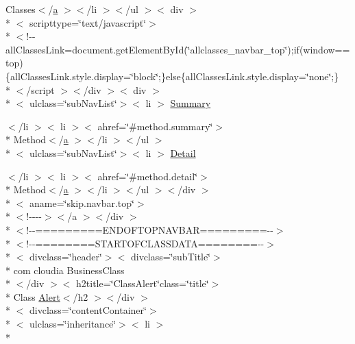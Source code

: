 \begin{DoxyCompactItemize}
\item 
Classes$<$/\hyperlink{style_8css_a5e8981582017bb8b84c21f148345d1f7}{a} $>$$<$/li $>$$<$/ul $>$$<$ div $>$\\*
$<$ scripttype=\char`\"{}text/javascript\char`\"{}$>$\\*
$<$!-\/-\/all\-Classes\-Link=document.\-get\-Element\-By\-Id(\char`\"{}allclasses\-\_\-navbar\-\_\-top\char`\"{});if(window==top)\{all\-Classes\-Link.\-style.\-display=\char`\"{}block\char`\"{};\}else\{all\-Classes\-Link.\-style.\-display=\char`\"{}none\char`\"{};\}\\*
$<$/script $>$$<$/div $>$$<$ div $>$\\*
$<$ ulclass=\char`\"{}sub\-Nav\-List\char`\"{}$>$$<$ li $>$ \hyperlink{_alert_8html_a6f9ab45abc9b0679dc1b132fbacfc681}{Summary}
\item 
$<$/li $>$$<$ li $>$$<$ ahref=\char`\"{}\#method.\-summary\char`\"{}$>$\\*
 Method$<$/\hyperlink{style_8css_a5e8981582017bb8b84c21f148345d1f7}{a} $>$$<$/li $>$$<$/ul $>$\\*
$<$ ulclass=\char`\"{}sub\-Nav\-List\char`\"{}$>$$<$ li $>$ \hyperlink{_alert_8html_aa01aa9a7e64a9f1aac58e251d8ce82ae}{Detail}
\item 
$<$/li $>$$<$ li $>$$<$ ahref=\char`\"{}\#method.\-detail\char`\"{}$>$\\*
 Method$<$/\hyperlink{style_8css_a5e8981582017bb8b84c21f148345d1f7}{a} $>$$<$/li $>$$<$/ul $>$$<$/div $>$\\*
$<$ aname=\char`\"{}skip.\-navbar.\-top\char`\"{}$>$\\*
$<$!-\/-\/-\/-\/$>$$<$/a $>$$<$/div $>$\\*
$<$!-\/-\/=========E\-N\-D\-O\-F\-T\-O\-P\-N\-A\-V\-B\-A\-R=========-\/-\/$>$\\*
$<$!-\/-\/========S\-T\-A\-R\-T\-O\-F\-C\-L\-A\-S\-S\-D\-A\-T\-A========-\/-\/$>$\\*
$<$ divclass=\char`\"{}header\char`\"{}$>$$<$ divclass=\char`\"{}sub\-Title\char`\"{}$>$\\*
 com cloudia Business\-Class\\*
$<$/div $>$$<$ h2title=\char`\"{}Class\-Alert\char`\"{}class=\char`\"{}title\char`\"{}$>$\\*
 Class \hyperlink{index-1_8html_afe3a1cf8e65b0946ddd29a67b4e60a3a}{Alert}$<$/h2 $>$$<$/div $>$\\*
$<$ divclass=\char`\"{}content\-Container\char`\"{}$>$\\*
$<$ ulclass=\char`\"{}inheritance\char`\"{}$>$$<$ li $>$\\*

\end{DoxyCompactItemize}

